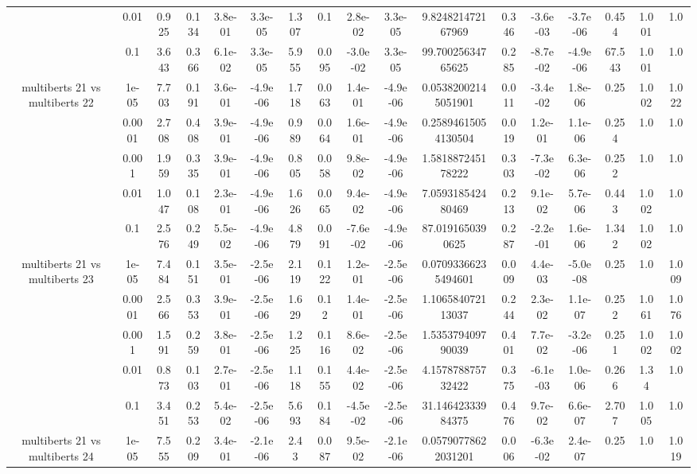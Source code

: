 \begin{tabular}{|c|c|c|c|c|c|c|c|c|c|c|c|c|c|c|c|c|}
 & 0.01 & 0.925 & 0.134 & 3.8e-01 & 3.3e-05 & 1.307 & 0.1 & 2.8e-02 & 3.3e-05 & 9.824821472167969 & 0.346 & -3.6e-03 & -3.7e-06 & 0.454 & 1.001 & 1.0 \\
 & 0.1 & 3.643 & 0.366 & 6.1e-02 & 3.3e-05 & 5.955 & 0.095 & -3.0e-02 & 3.3e-05 & 99.70025634765625 & 0.285 & -8.7e-02 & -4.9e-06 & 67.543 & 1.001 & 1.0 \\
\hline
\multirow{5}{*}{multiberts 21 vs multiberts 22} & 1e-05 & 7.703 & 0.191 & 3.6e-01 & -4.9e-06 & 1.718 & 0.063 & 1.4e-01 & -4.9e-06 & 0.05382002145051901 & 0.011 & -3.4e-02 & 1.8e-06 & 0.25 & 1.002 & 1.022 \\
 & 0.0001 & 2.708 & 0.408 & 3.9e-01 & -4.9e-06 & 0.989 & 0.064 & 1.6e-01 & -4.9e-06 & 0.25894615054130504 & 0.019 & 1.2e-01 & 1.1e-06 & 0.254 & 1.0 & 1.0 \\
 & 0.001 & 1.959 & 0.335 & 3.9e-01 & -4.9e-06 & 0.805 & 0.058 & 9.8e-02 & -4.9e-06 & 1.581887245178222 & 0.303 & -7.3e-02 & 6.3e-06 & 0.252 & 1.0 & 1.0 \\
 & 0.01 & 1.047 & 0.108 & 2.3e-01 & -4.9e-06 & 1.626 & 0.065 & 9.4e-02 & -4.9e-06 & 7.059318542480469 & 0.213 & 9.1e-02 & 5.7e-06 & 0.443 & 1.002 & 1.0 \\
 & 0.1 & 2.576 & 0.249 & 5.5e-02 & -4.9e-06 & 4.879 & 0.091 & -7.6e-02 & -4.9e-06 & 87.0191650390625 & 0.287 & -2.2e-01 & 1.6e-06 & 1.342 & 1.002 & 1.0 \\
\hline
\multirow{5}{*}{multiberts 21 vs multiberts 23} & 1e-05 & 7.484 & 0.151 & 3.5e-01 & -2.5e-06 & 2.119 & 0.122 & 1.2e-01 & -2.5e-06 & 0.07093366235494601 & 0.009 & 4.4e-03 & -5.0e-08 & 0.25 & 1.0 & 1.009 \\
 & 0.0001 & 2.566 & 0.353 & 3.9e-01 & -2.5e-06 & 1.629 & 0.12 & 1.4e-01 & -2.5e-06 & 1.106584072113037 & 0.244 & 2.3e-02 & 1.1e-07 & 0.252 & 1.061 & 1.076 \\
 & 0.001 & 1.591 & 0.259 & 3.8e-01 & -2.5e-06 & 1.225 & 0.116 & 8.6e-02 & -2.5e-06 & 1.535379409790039 & 0.401 & 7.7e-02 & -3.2e-06 & 0.251 & 1.002 & 1.002 \\
 & 0.01 & 0.873 & 0.103 & 2.7e-01 & -2.5e-06 & 1.118 & 0.155 & 4.4e-02 & -2.5e-06 & 4.157878875732422 & 0.375 & -6.1e-03 & 1.0e-06 & 0.266 & 1.34 & 1.0 \\
 & 0.1 & 3.451 & 0.253 & 5.4e-02 & -2.5e-06 & 5.693 & 0.184 & -4.5e-02 & -2.5e-06 & 31.14642333984375 & 0.476 & 9.7e-02 & 6.6e-07 & 2.707 & 1.005 & 1.0 \\
\hline
\multirow{5}{*}{multiberts 21 vs multiberts 24} & 1e-05 & 7.555 & 0.209 & 3.4e-01 & -2.1e-06 & 2.43 & 0.087 & 9.5e-02 & -2.1e-06 & 0.05790778622031201 & 0.006 & -6.3e-02 & 2.4e-07 & 0.25 & 1.0 & 1.019 \\

\end{tabular}
